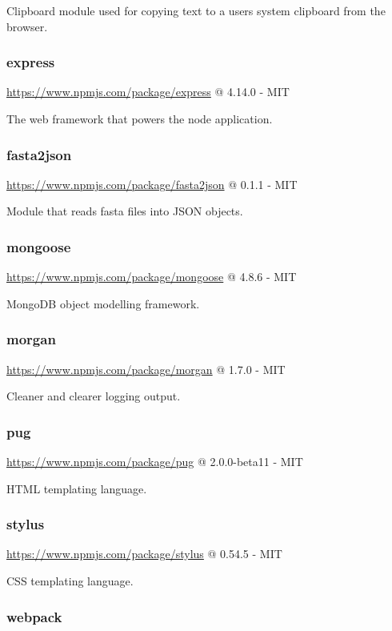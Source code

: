 Clipboard module used for copying text to a users system clipboard from the browser.


\subsubsection*{express}

\url{https://www.npmjs.com/package/express} @ 4.14.0 - MIT

The web framework that powers the node application.

\subsubsection*{fasta2json}

\url{https://www.npmjs.com/package/fasta2json} @ 0.1.1 - MIT

Module that reads fasta files into JSON objects.

\subsubsection*{mongoose}

\url{https://www.npmjs.com/package/mongoose} @ 4.8.6 - MIT

MongoDB object modelling framework.

\subsubsection*{morgan}

\url{https://www.npmjs.com/package/morgan} @ 1.7.0 - MIT

Cleaner and clearer logging output.

\subsubsection*{pug}

\url{https://www.npmjs.com/package/pug} @ 2.0.0-beta11 - MIT

HTML templating language.

\subsubsection*{stylus}

\url{https://www.npmjs.com/package/stylus} @ 0.54.5 - MIT

CSS templating language.

\subsubsection*{webpack}

